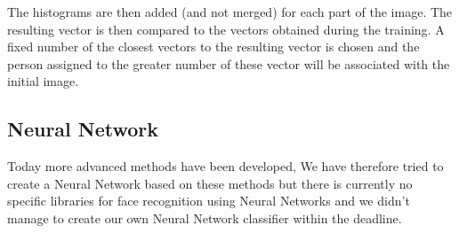 The histograms are then added (and not merged) for each part of the image. The resulting vector is then compared to the vectors obtained during the training. A fixed number of the closest vectors to the resulting vector is chosen and the person assigned to the greater number of these vector will be associated with the initial image.

\subsection{Neural Network}
Today more advanced methods have been developed, We have therefore tried to create a Neural Network based on these methods but there is currently no specific libraries for face recognition using Neural 
Networks and we didn't manage to create our own Neural Network classifier within the deadline.
